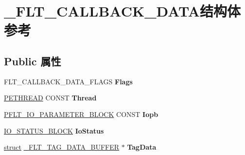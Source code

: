 \hypertarget{struct___f_l_t___c_a_l_l_b_a_c_k___d_a_t_a}{}\section{\+\_\+\+F\+L\+T\+\_\+\+C\+A\+L\+L\+B\+A\+C\+K\+\_\+\+D\+A\+T\+A结构体 参考}
\label{struct___f_l_t___c_a_l_l_b_a_c_k___d_a_t_a}
\subsection*{Public 属性}
\begin{DoxyCompactItemize}
\item 
\mbox{\label{struct___f_l_t___c_a_l_l_b_a_c_k___d_a_t_a_a5164dabb08292531b7c11d59ee68ad3c}} 
F\+L\+T\+\_\+\+C\+A\+L\+L\+B\+A\+C\+K\+\_\+\+D\+A\+T\+A\+\_\+\+F\+L\+A\+GS {\bfseries Flags}
\item 
\mbox{\label{struct___f_l_t___c_a_l_l_b_a_c_k___d_a_t_a_a36492042823a8c19213c1579656af29d}} 
\hyperlink{struct___e_t_h_r_e_a_d}{P\+E\+T\+H\+R\+E\+AD} C\+O\+N\+ST {\bfseries Thread}
\item 
\mbox{\label{struct___f_l_t___c_a_l_l_b_a_c_k___d_a_t_a_a387def913888dfeb8d689638fb6b339a}} 
\hyperlink{struct___f_l_t___i_o___p_a_r_a_m_e_t_e_r___b_l_o_c_k}{P\+F\+L\+T\+\_\+\+I\+O\+\_\+\+P\+A\+R\+A\+M\+E\+T\+E\+R\+\_\+\+B\+L\+O\+CK} C\+O\+N\+ST {\bfseries Iopb}
\item 
\mbox{\label{struct___f_l_t___c_a_l_l_b_a_c_k___d_a_t_a_aad6515258aa11758771a1507ffdbb5e6}} 
\hyperlink{struct___i_o___s_t_a_t_u_s___b_l_o_c_k}{I\+O\+\_\+\+S\+T\+A\+T\+U\+S\+\_\+\+B\+L\+O\+CK} {\bfseries Io\+Status}
\item 
\mbox{\label{struct___f_l_t___c_a_l_l_b_a_c_k___d_a_t_a_a0a687a197903379b2413430b0f3decd6}} 
\hyperlink{interfacestruct}{struct} \hyperlink{struct___f_l_t___t_a_g___d_a_t_a___b_u_f_f_e_r}{\+\_\+\+F\+L\+T\+\_\+\+T\+A\+G\+\_\+\+D\+A\+T\+A\+\_\+\+B\+U\+F\+F\+ER} $\ast$ {\bfseries Tag\+Data}
\item 

\end{DoxyCompactItemize}
